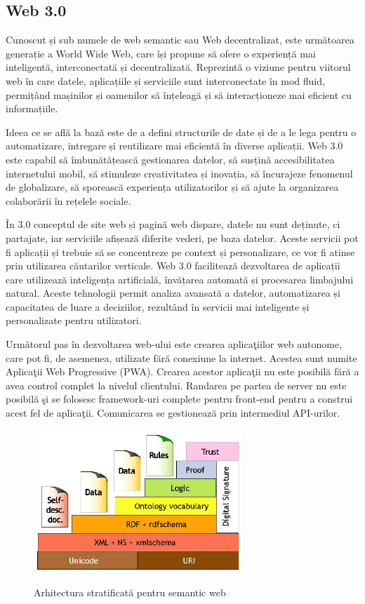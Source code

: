 \documentclass[12pt, a4paper]{report}
\begin{document}
\subsection{Web 3.0}

Cunoscut și sub numele de web semantic sau Web decentralizat, este următoarea generație a World Wide Web, care își propune să ofere o experiență mai inteligentă, interconectată și decentralizată. Reprezintă o viziune pentru viitorul web în care datele, aplicațiile și serviciile sunt interconectate în mod fluid, permițând mașinilor și oamenilor să înțeleagă și să interacționeze mai eficient cu informațiile.

Ideea ce se află la bază este de a defini structurile de date și de a le lega pentru o automatizare, intregare și reutilizare mai eficientă în diverse aplicații. Web 3.0 este capabil să îmbunătățească gestionarea datelor, să susțină accesibilitatea internetului mobil, să stimuleze creativitatea și inovația, să încurajeze fenomenul de globalizare, să sporească experiența utilizatorilor și să ajute la organizarea colaborării în rețelele sociale. \cite{semantic-web}

În 3.0 conceptul de site web și pagină web dispare, datele nu sunt deținute, ci partajate, iar serviciile afișează diferite vederi, pe baza datelor. Aceste servicii pot fi aplicații și trebuie să se concentreze pe context și personalizare, ce vor fi atinse prin utilizarea căutarilor verticale. Web 3.0 facilitează dezvoltarea de aplicații care utilizează inteligența artificială, învățarea automată și procesarea limbajului natural. Aceste tehnologii permit analiza avansată a datelor, automatizarea și capacitatea de luare a deciziilor, rezultând în servicii mai inteligente și personalizate pentru utilizatori.

Urm\u atorul pas \^ in dezvoltarea web-ului este crearea aplica\c tiilor web autonome, care pot fi, de asemenea, utilizate f\u ar\u a conexiune la internet. Acestea sunt numite Aplica\c tii Web Progressive (PWA). Crearea acestor aplica\c tii nu este posibil\u a f\u ar\u a a avea control complet la nivelul clientului. Randarea pe partea de server nu este posibil\u a \c si se folosesc framework-uri complete pentru front-end pentru a construi acest fel de aplica\c tii. Comunicarea se gestioneaz\u a prin intermediul API-urilor.\cite{pwa}


\begin{figure}[htbp]
	\centering
	\includegraphics[width=0.7\textwidth]{layered_architecture.png} \label{fig:layered}
	\caption{Arhitectura stratificată pentru semantic web \protect\footnotemark}
\end{figure}
\end{document}
